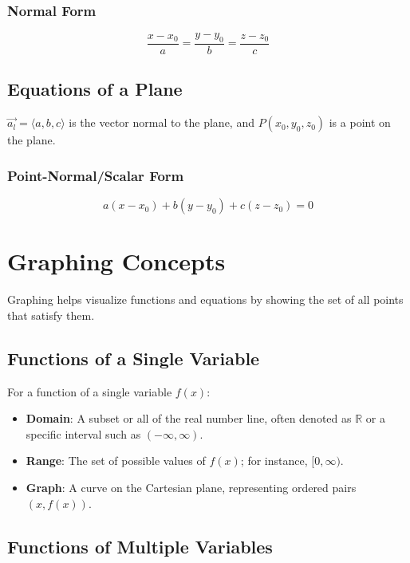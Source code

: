 \documentclass[a4paper,12pt,openany]{book}
\begin{document}
\subsubsection{Normal Form}
\begin{equation}
    \frac{x-x_0}{a} = \frac{y-y_0}{b} = \frac{z-z_0}{c}
\end{equation}

\subsection{Equations of a Plane}
\(\vec{a_l} = \langle a, b, c \rangle\) is the vector normal to the plane, and \(P(x_0, y_0, z_0)\) is a point on the plane.
\subsubsection{Point-Normal/Scalar Form}
\begin{equation}
    a(x-x_0) + b(y-y_0) + c(z-z_0) = 0
\end{equation}
\section{Graphing Concepts}

Graphing helps visualize functions and equations by showing the set of all points that satisfy them.

\subsection{Functions of a Single Variable}

For a function of a single variable \( f(x) \):
\begin{itemize}
    \item \textbf{Domain}: A subset or all of the real number line, often denoted as \(\mathbb{R}\) or a specific interval such as \((- \infty, \infty)\).
    \item \textbf{Range}: The set of possible values of \( f(x) \); for instance, \([0, \infty)\).
    \item \textbf{Graph}: A curve on the Cartesian plane, representing ordered pairs \((x, f(x))\).
\end{itemize}

\subsection{Functions of Multiple Variables}
\end{document}
